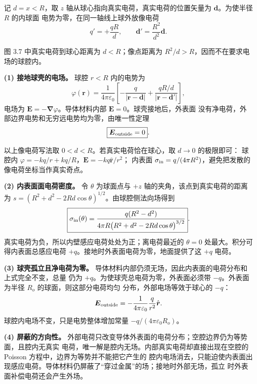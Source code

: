 \begin{xesolution}
记 $d=x<R$，取 $z$ 轴从球心指向真实电荷，真实电荷的位置矢量为 $\boldsymbol d$。为使半径 $R$ 的内球面
电势为零，在同一轴线上球外放像电荷
\[
  q'=+\frac{qR}{d},\qquad
  \boldsymbol d'=\frac{R^2}{d^2}\boldsymbol d.
\]

图 3.7 中真实电荷到球心距离为 $d<R$；像点距离为 $R^2/d>R$，因而不在要求电场的球腔内。

\cavityImageFigure
{}

\textbf{(1) 接地球壳的电场。} 球腔 $r<R$ 内的电势为
\[
  \boxed{\varphi(\boldsymbol r)=\frac1{4\pi\varepsilon_0}
  \left[-\frac q{|\boldsymbol r-\boldsymbol d|}
  +\frac{qR/d}{|\boldsymbol r-\boldsymbol d'|}\right]},
\]
电场为 $\boldsymbol E=-\boldsymbol\nabla\varphi$。导体材料内部 $\boldsymbol E=0$。球壳接地后，外表面
没有净电荷，外部边界电势和无穷远电势均为零，由唯一性定理
\[
  \boxed{\boldsymbol E_{\rm outside}=0}.
\]

以上像电荷写法取 $0<d<R$。若真实电荷恰在球心，取 $d\to0$ 的极限即可：
球腔内 $\varphi=-kq/r+kq/R$，$\boldsymbol E=-kq\hat{\boldsymbol r}/r^2$；
内表面 $\sigma_{\rm in}=q/(4\pi R^2)$，避免把发散的像电荷坐标当作真实奇点。

\textbf{(2) 内表面面电荷密度。} 令 $\theta$ 为球面点与 $+z$ 轴的夹角，该点到真实电荷的距离为
$s=(R^2+d^2-2Rd\cos\theta)^{1/2}$。由球腔侧法向场得到
\[
  \boxed{\sigma_{\rm in}(\theta)=
  \frac{q(R^2-d^2)}{4\pi R\bigl(R^2+d^2-2Rd\cos\theta\bigr)^{3/2}}}.
\]
真实电荷为负，所以内壁感应电荷处处为正；离电荷最近的 $\theta=0$ 处最大。积分可得内表面总感应电荷
$+q$。接地时外表面电荷为零，地面提供了这 $+q$ 电荷。

\textbf{(3) 球壳孤立且净电荷为零。} 导体材料内部仍须无场，因此内表面的电荷分布和上式完全不变，总量
仍为 $+q$。为使球壳总电荷为零，外表面必须带 $-q$。外表面为半径 $R_o$ 的球面，则这部分电荷均匀
分布，外部电场等效于球心的 $-q$：
\[
  \boldsymbol E_{\rm outside}=-\frac1{4\pi\varepsilon_0}
  \frac q{r^2}\hat{\boldsymbol r}.
\]
球腔内电场不变，只是电势整体增加常量 $-q/(4\pi\varepsilon_0R_o)$。

\textbf{(4) 屏蔽的方向性。} 外部电荷只改变导体外表面的电荷分布；空腔边界仍为等势面，且腔内无真实
电荷，唯一解是腔内无场。内部真实电荷却直接出现在空腔的 Poisson 方程中，边界为等势并不能把它产生的
腔内电场消去，只能迫使内表面出现感应电荷。导体材料仍屏蔽了“穿过金属”的场；接地时外部无场，孤立
时外表面补偿电荷还会产生外场。
\end{xesolution}

